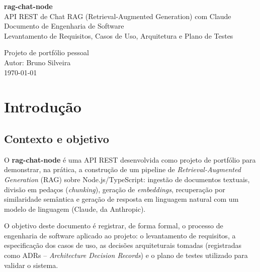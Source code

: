 \documentclass[11pt,a4paper]{article}
\begin{document}
\begin{titlepage}
    \centering
    \vspace*{2cm}
    {\Huge\bfseries\color{primaria} rag-chat-node}\\[0.5cm]
    {\Large API REST de Chat RAG (Retrieval-Augmented Generation) com Claude}\\[2cm]
    {\large Documento de Engenharia de Software}\\[0.3cm]
    {\large Levantamento de Requisitos, Casos de Uso, Arquitetura e Plano de Testes}\\[3cm]


    \vspace{3cm}
    {\large Projeto de portfólio pessoal}\\[0.2cm]
    {\large Autor: Bruno Silveira}\\[2cm]

    \vfill
    {\large \today}
\end{titlepage}

\tableofcontents
\newpage

\section{Introdução}

\subsection{Contexto e objetivo}

O \textbf{rag-chat-node} é uma API REST desenvolvida como projeto de portfólio para
demonstrar, na prática, a construção de um pipeline de \emph{Retrieval-Augmented
Generation} (RAG) sobre Node.js/TypeScript: ingestão de documentos textuais, divisão
em pedaços (\emph{chunking}), geração de \emph{embeddings}, recuperação por
similaridade semântica e geração de resposta em linguagem natural com um modelo de
linguagem (Claude, da Anthropic).

O objetivo deste documento é registrar, de forma formal, o processo de engenharia de
software aplicado ao projeto: o levantamento de requisitos, a especificação dos casos
de uso, as decisões arquiteturais tomadas (registradas como ADRs -- \emph{Architecture
Decision Records}) e o plano de testes utilizado para validar o sistema.
\end{document}
